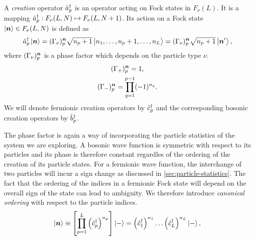             \begin{definition}
                \label{def:creation_1}
                A \emph{creation} operator $\hat{a}_{p}^{\dagger}$ is an operator acting on
                Fock states in $F_{\nu}(L)$.
                It is a mapping $\hat{a}_{p}^{\dagger}: F_{\nu}(L, N) \mapsto F_{\nu}(L, N +
                1)$.
                Its action on a Fock state $\ket{\boldsymbol{n}} \in F_{\nu}(L, N)$ is
                defined as
                \begin{align}
                    \hat{a}_{p}^{\dagger}\ket{\boldsymbol{n}}
                    = (\Gamma_{\nu})^{\boldsymbol{n}}_{p}
                    \sqrt{n_p + 1}
                    \ket{n_1, \dots, n_p + 1, \dots, n_L}
                    = (\Gamma_{\nu})^{\boldsymbol{n}}_{p}
                    \sqrt{n_p + 1}
                    \ket{\boldsymbol{n}'},
                    \label{eq:general_creation}
                \end{align}
                where $(\Gamma_{\nu})^{\boldsymbol{n}}_{p}$ is a phase factor which
                depends on the particle type $\nu$.
                \begin{gather}
                    (\Gamma_{+})^{\boldsymbol{n}}_{p} = 1, \\
                    (\Gamma_{-})^{\boldsymbol{n}}_{p}
                    = \prod_{q = 1}^{p - 1} (-1)^{n_q}.
                \end{gather}
                We will denote fermionic creation operators by $\hat{c}_{p}^{\dagger}$ and the
                corresponding bosonic creation operators by $\hat{b}_{p}^{\dagger}$.
            \end{definition}
            The phase factor is again a way of incorporating the particle
            statistics of the system we are exploring.
            A bosonic wave function is symmetric with respect to its particles
            and its phase is therefore constant regardles of the ordering of the
            creation of its particle states.
            For a fermionic wave function, the interchange of two particles will
            incur a sign change as discussed in
            \autoref{sec:particle-statistics}.
            The fact that the ordering of the indices in a fermionic Fock state
            will depend on the overall sign of the state can lead to ambiguity.
            We therefore introduce \emph{canonical ordering} with respect to the
            particle indices.
            \begin{align}
                \ket{\boldsymbol{n}}
                \equiv \left[ 
                    \prod_{p = 1}^{L}
                    \left( \hat{c}_{p}^{\dagger} \right)^{n_p}
                 \right]\ket{-}
                = \left( \hat{c}_{1}^{\dagger} \right)^{n_1}\dots\left( \hat{c}_{L}^{\dagger} \right)^{n_L}\ket{-},
                \label{eq:canonical-fock-state}
            \end{align}

